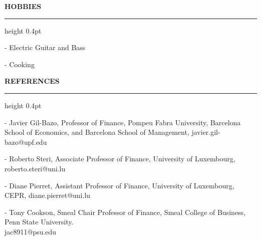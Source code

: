 \documentclass[11pt,letterpaper]{article}
\makeatletter
\newcommand{\cvsection}[1]{%
  \par\vspace{12.80pt}%
  \textbf{#1}\par\nobreak
  \vspace{6.08pt}\hrule height 0.4pt\nobreak\vspace{6.9pt}\nobreak}
\newenvironment{cvbody}
  {\begin{list}{}{%
      \@beginparpenalty\@M      %
      \setlength{\leftmargin}{1.5em}%
      \setlength{\rightmargin}{0pt}%
      \setlength{\labelwidth}{0pt}%
      \setlength{\labelsep}{0pt}%
      \setlength{\listparindent}{0pt}%
      \setlength{\itemindent}{0pt}%
      \setlength{\topsep}{0pt}%
      \setlength{\partopsep}{0pt}%
      \setlength{\parsep}{0pt}%
      \setlength{\itemsep}{0pt}}%
   \item\relax}
  {\end{list}}
\makeatother
\begin{document}
\cvsection{HOBBIES}
\begin{cvbody}
- Electric Guitar and Bass\par
- Cooking\par
\end{cvbody}

\cvsection{REFERENCES}
\begin{cvbody}
- Javier Gil-Bazo, Professor of Finance, Pompeu Fabra University, Barcelona School of Economics, and Barcelona School of Management, javier.gil-bazo@upf.edu\par
- Roberto Steri, Associate Professor of Finance, University of Luxembourg, roberto.steri@uni.lu\par
- Diane Pierret, Assistant Professor of Finance, University of Luxembourg, CEPR, diane.pierret@uni.lu\par
- Tony Cookson, Smeal Chair Professor of Finance, Smeal College of Business, Penn State University.\\
jac8911@psu.edu\par
\end{cvbody}
\end{document}

